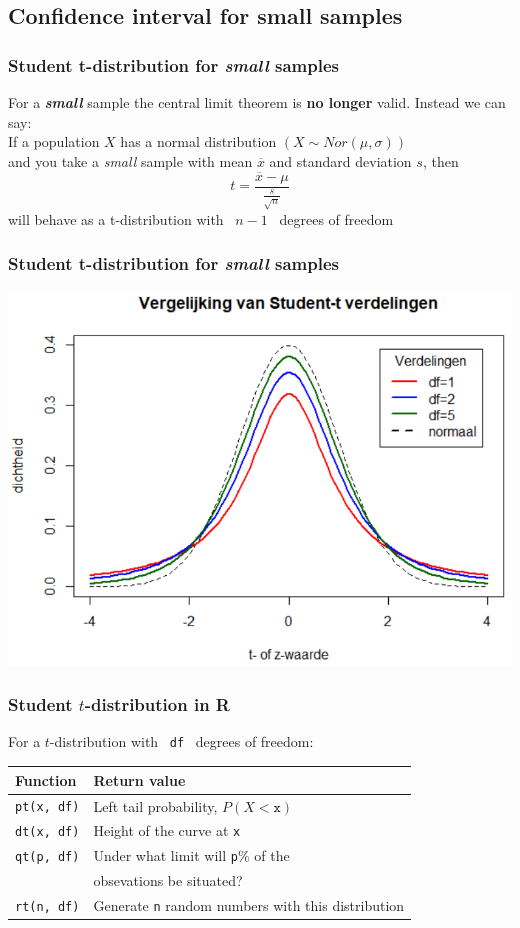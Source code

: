 \documentclass{beamer}
\begin{document}
\subsection{Confidence interval for small samples}

\begin{frame}
\frametitle{Student t-distribution for \textit{small} samples}
For a \textit{\textbf{small}} sample the central limit theorem is \textbf{no longer} valid.
\vfill
Instead we can say:\\
\vfill
If a population $X$ has a normal distribution $(X \sim Nor(\mu,\sigma))$\\
and you take a \textit{small} sample with mean $\overline{x}$ and standard deviation $s$, then
\[ t = \frac{\overline{x} - \mu}{\frac{s}{\sqrt{n}}} \]
will behave as a t-distribution with ~$n-1$~ degrees of freedom
\end{frame}

\begin{frame}
\frametitle{Student t-distribution for \textit{small} samples}
\includegraphics[width=\linewidth]{img/les04-t-distrib}
\end{frame}


\begin{frame}[fragile]
\frametitle{Student $t$-distribution in R}

For a $t$-distribution with ~\texttt{df}~ degrees of freedom:\\
\vfill
\centering
\begin{tabular}{ll}
    \textbf{Function} & \textbf{Return value}                                    \\ \hline
    \verb|pt(x, df)| & Left tail probability, $P(X<\mathtt{x})$                  \\
    \verb|dt(x, df)| & Height of the curve at \texttt{x}                     \\
    \verb|qt(p, df)| & Under what limit will \texttt{p}\% of the     \\
    & obsevations be situated?                             \\
    \verb|rt(n, df)| & Generate \texttt{n} random numbers with this distribution
\end{tabular}
\end{frame}
\end{document}
